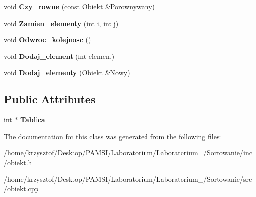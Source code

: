 \begin{DoxyCompactItemize}
\item 
\hypertarget{class_obiekt_a3e8670b709172fc0a63df917f41c98cf}{void {\bfseries \-Czy\-\_\-rowne} (const \hyperlink{class_obiekt}{\-Obiekt} \&\-Porownywany)}\label{class_obiekt_a3e8670b709172fc0a63df917f41c98cf}

\item 
\hypertarget{class_obiekt_a46517777b9e80cc1ddc434d67922fe9a}{void {\bfseries \-Zamien\-\_\-elementy} (int i, int j)}\label{class_obiekt_a46517777b9e80cc1ddc434d67922fe9a}

\item 
\hypertarget{class_obiekt_a28ec1565e960673b6f762c3488aa7ca6}{void {\bfseries \-Odwroc\-\_\-kolejnosc} ()}\label{class_obiekt_a28ec1565e960673b6f762c3488aa7ca6}

\item 
\hypertarget{class_obiekt_ac0f67824826a384077bc30e51552a9a7}{void {\bfseries \-Dodaj\-\_\-element} (int element)}\label{class_obiekt_ac0f67824826a384077bc30e51552a9a7}

\item 
\hypertarget{class_obiekt_ae70037bf4b1f582c7a1e09c16314ac83}{void {\bfseries \-Dodaj\-\_\-elementy} (\hyperlink{class_obiekt}{\-Obiekt} \&\-Nowy)}\label{class_obiekt_ae70037bf4b1f582c7a1e09c16314ac83}

\end{DoxyCompactItemize}
\subsection*{\-Public \-Attributes}
\begin{DoxyCompactItemize}
\item 
\hypertarget{class_obiekt_a877ac2b65043327767012c184067f269}{int $\ast$ {\bfseries \-Tablica}}\label{class_obiekt_a877ac2b65043327767012c184067f269}

\end{DoxyCompactItemize}


\-The documentation for this class was generated from the following files\-:\begin{DoxyCompactItemize}
\item 
/home/krzysztof/\-Desktop/\-P\-A\-M\-S\-I/\-Laboratorium/\-Laboratorium\-\_/\-Sortowanie/inc/obiekt.\-h\item 
/home/krzysztof/\-Desktop/\-P\-A\-M\-S\-I/\-Laboratorium/\-Laboratorium\-\_/\-Sortowanie/src/obiekt.\-cpp\end{DoxyCompactItemize}

